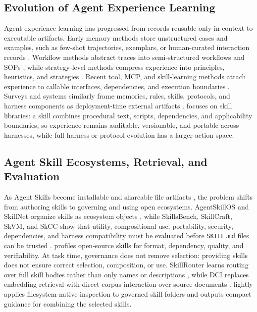 \subsection{Evolution of Agent Experience Learning}
Agent experience learning has progressed from records reusable only in context to executable artifacts. Early memory methods store unstructured cases and examples, such as few-shot trajectories, exemplars, or human-curated interaction records \citep{zhou2025memento,zheng2024synapse,wang2026memgovern}. Workflow methods abstract traces into semi-structured workflows and SOPs \citep{wang2025agent,fang2025memp}, while strategy-level methods compress experience into principles, heuristics, and strategies \citep{zhao2024expel,ouyang2026reasoningbank,cao2025remember,zhang2026agentic,cai2025training,cai2025flex,wang2026procedural}. Recent tool, MCP, and skill-learning methods attach experience to callable interfaces, dependencies, and execution boundaries \citep{lu2026beyond,liu2025unifying,huang2025cascade}. Surveys and systems similarly frame memories, rules, skills, protocols, and harness components as deployment-time external artifacts \citep{zhang2026experience,zhou2026externalization,lin2026position,zhang2026autogenesis,liang2026genericagent,lin2026agentic}. \ours focuses on skill libraries: a skill combines procedural text, scripts, dependencies, and applicability boundaries, so experience remains auditable, versionable, and portable across harnesses, while full harness or protocol evolution has a larger action space.

\subsection{Agent Skill Ecosystems, Retrieval, and Evaluation}
As Agent Skills become installable and shareable file artifacts \citep{agentSkills,anthropic2026claudeCodeSkills,openai2026ChatgptSkillsDocs,skillsmp2026,skillssh2026,openclaw2026SkillsDocs,hermes2026AgentSkillsGuide,openclaw2026clawhub}, the problem shifts from authoring skills to governing and using open ecosystems. AgentSkillOS and SkillNet organize skills as ecosystem objects \citep{li2026organizing,liang2026skillnet}, while SkillsBench, SkillCraft, SkVM, and SkCC show that utility, compositional use, portability, security, dependencies, and harness compatibility must be evaluated before \texttt{SKILL.md} files can be trusted \citep{li2026skillsbench,chen2026skillcraft,skvm2026,ouyang2026skcc}. \ours profiles open-source skills for format, dependency, quality, and verifiability. At task time, governance does not remove selection: providing skills does not ensure correct selection, composition, or use. SkillRouter learns routing over full skill bodies rather than only names or descriptions \citep{zheng2026skillrouter}, while DCI replaces embedding retrieval with direct corpus interaction over source documents \citep{li2026beyond}. \ours lightly applies filesystem-native inspection to governed skill folders and outputs compact guidance for combining the selected skills.

